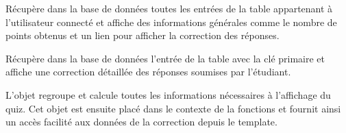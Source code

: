 \documentclass[a4,10pt,french]{sphinxmanual}
\begin{document}

\begin{fulllineitems}
\label{source:quiz.views.completed_quizzes}
Récupère dans la base de données toutes les entrées de la table 
appartenant à l'utilisateur connecté et affiche des informations générales comme
le nombre de points obtenus et un lien pour afficher la correction des réponses.

\end{fulllineitems}


\begin{fulllineitems}
\label{source:quiz.views.correct}
Récupère dans la base de données l'entrée de la table  avec
la clé primaire  et affiche une correction détaillée des réponses soumises
par l'étudiant.

L'objet  regroupe et calcule toutes les informations nécessaires
à l'affichage du quiz. Cet objet est ensuite placé dans le contexte de la fonctions
 et fournit ainsi un accès facilité aux données de la correction depuis
le template.

\end{fulllineitems}

\end{document}

